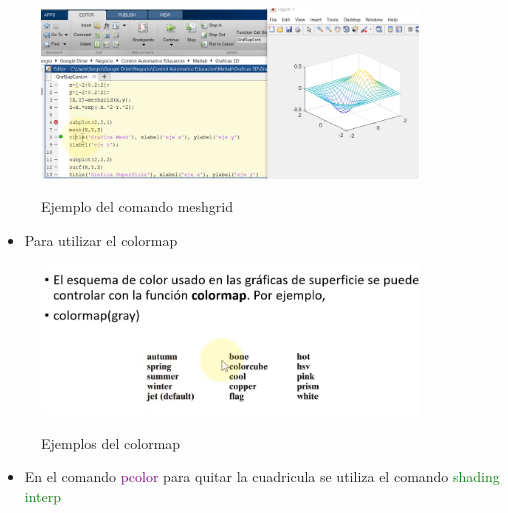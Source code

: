 \documentclass{article}
\begin{document}
	\begin{figure}[h!]
		\centering
		\includegraphics[width = 100mm]{imagenes/Funciones/ejemplodemeshgrid}
		\label{gridejemplo}
		\caption{Ejemplo del comando meshgrid}
	\end{figure}
	
	\begin{itemize}
		\item Para utilizar el colormap 
	\end{itemize}

		\begin{figure}[h!]
		\centering
		\includegraphics[width = 100mm]{imagenes/Funciones/colormap}
		\label{colormap}
		\caption{Ejemplos del colormap}
	\end{figure}
	
	\begin{itemize}
		\item En el comando \textcolor{purple}{pcolor} para quitar la cuadricula se utiliza el comando \textcolor{green}{shading interp}
	\end{itemize}
	
	
\end{document}
